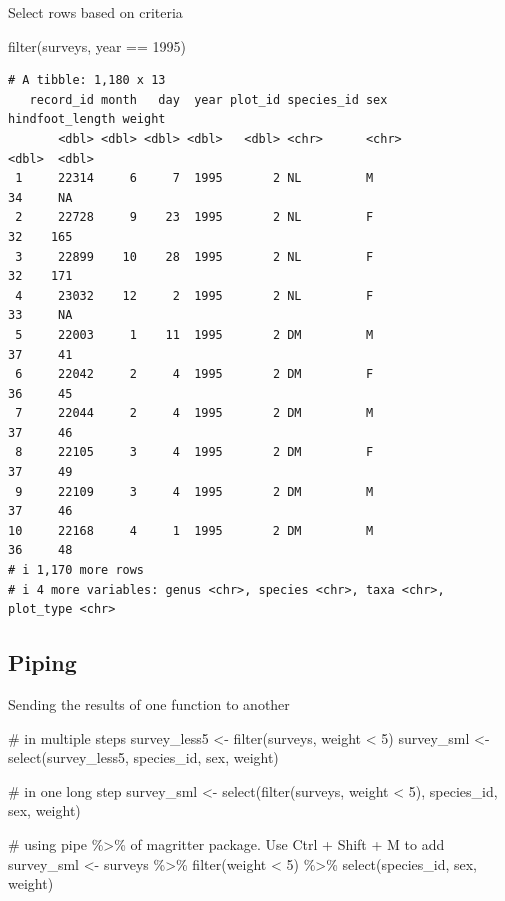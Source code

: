 \documentclass[
  letterpaper,
  DIV=11,
  numbers=noendperiod]{scrreprt}
\newenvironment{Shaded}{\begin{snugshade}}{\end{snugshade}}
\newcommand{\CommentTok}[1]{\textcolor[rgb]{0.37,0.37,0.37}{#1}}
\newcommand{\DecValTok}[1]{\textcolor[rgb]{0.68,0.00,0.00}{#1}}
\newcommand{\FunctionTok}[1]{\textcolor[rgb]{0.28,0.35,0.67}{#1}}
\newcommand{\NormalTok}[1]{\textcolor[rgb]{0.00,0.23,0.31}{#1}}
\newcommand{\OtherTok}[1]{\textcolor[rgb]{0.00,0.23,0.31}{#1}}
\newcommand{\SpecialCharTok}[1]{\textcolor[rgb]{0.37,0.37,0.37}{#1}}
\begin{document}
Select rows based on criteria

\begin{Shaded}
\begin{Highlighting}[]
\FunctionTok{filter}\NormalTok{(surveys, year }\SpecialCharTok{==} \DecValTok{1995}\NormalTok{)}
\end{Highlighting}
\end{Shaded}

\begin{verbatim}
# A tibble: 1,180 x 13
   record_id month   day  year plot_id species_id sex   hindfoot_length weight
       <dbl> <dbl> <dbl> <dbl>   <dbl> <chr>      <chr>           <dbl>  <dbl>
 1     22314     6     7  1995       2 NL         M                  34     NA
 2     22728     9    23  1995       2 NL         F                  32    165
 3     22899    10    28  1995       2 NL         F                  32    171
 4     23032    12     2  1995       2 NL         F                  33     NA
 5     22003     1    11  1995       2 DM         M                  37     41
 6     22042     2     4  1995       2 DM         F                  36     45
 7     22044     2     4  1995       2 DM         M                  37     46
 8     22105     3     4  1995       2 DM         F                  37     49
 9     22109     3     4  1995       2 DM         M                  37     46
10     22168     4     1  1995       2 DM         M                  36     48
# i 1,170 more rows
# i 4 more variables: genus <chr>, species <chr>, taxa <chr>, plot_type <chr>
\end{verbatim}

\subsection{Piping}\label{piping}

Sending the results of one function to another

\begin{Shaded}
\begin{Highlighting}[]
\CommentTok{\# in multiple steps}
\NormalTok{survey\_less5 }\OtherTok{\textless{}{-}} \FunctionTok{filter}\NormalTok{(surveys, weight }\SpecialCharTok{\textless{}} \DecValTok{5}\NormalTok{)}
\NormalTok{survey\_sml }\OtherTok{\textless{}{-}} \FunctionTok{select}\NormalTok{(survey\_less5, species\_id, sex, weight)}

\CommentTok{\# in one long step}
\NormalTok{survey\_sml }\OtherTok{\textless{}{-}} \FunctionTok{select}\NormalTok{(}\FunctionTok{filter}\NormalTok{(surveys, weight }\SpecialCharTok{\textless{}} \DecValTok{5}\NormalTok{), species\_id, sex, weight)}

\CommentTok{\# using pipe \%\textgreater{}\% of magritter package.  Use Ctrl + Shift + M to add}
\NormalTok{survey\_sml }\OtherTok{\textless{}{-}}\NormalTok{ surveys }\SpecialCharTok{\%\textgreater{}\%}
    \FunctionTok{filter}\NormalTok{(weight }\SpecialCharTok{\textless{}} \DecValTok{5}\NormalTok{) }\SpecialCharTok{\%\textgreater{}\%}
    \FunctionTok{select}\NormalTok{(species\_id, sex, weight)}
\end{Highlighting}
\end{Shaded}
\end{document}
